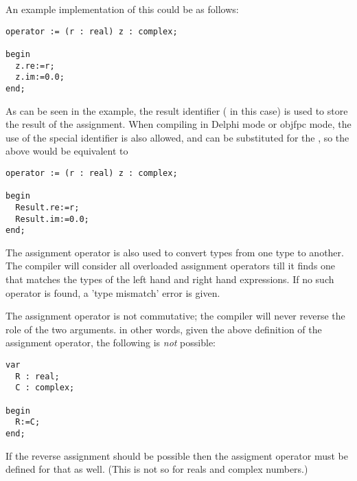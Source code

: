 An example implementation of this could be as follows:
\begin{verbatim}
operator := (r : real) z : complex;

begin
  z.re:=r;
  z.im:=0.0;
end;
\end{verbatim}
As can be seen in the example, the result identifier ( in this case)
is used to store the result of the assignment. When compiling in Delphi mode
or objfpc mode, the use of the special identifier  is also
allowed, and can be substituted for the , so the above would be
equivalent to
\begin{verbatim}
operator := (r : real) z : complex;

begin
  Result.re:=r;
  Result.im:=0.0;
end;
\end{verbatim}

The assignment operator is also used to convert types from one type to
another. The compiler will consider all overloaded assignment operators
till it finds one that matches the types of the left hand and right hand
expressions. If no such operator is found, a 'type mismatch' error
is given.

\begin{remark}
The assignment operator is not commutative; the compiler will never reverse
the role of the two arguments. in other words, given the above definition of
the assignment operator, the following is {\em not} possible:
\begin{verbatim}
var
  R : real;
  C : complex;

begin
  R:=C;
end;
\end{verbatim}
If the reverse assignment should be possible then the assigment operator 
must be defined for that as well.
(This is not so for reals and complex numbers.)
\end{remark}

